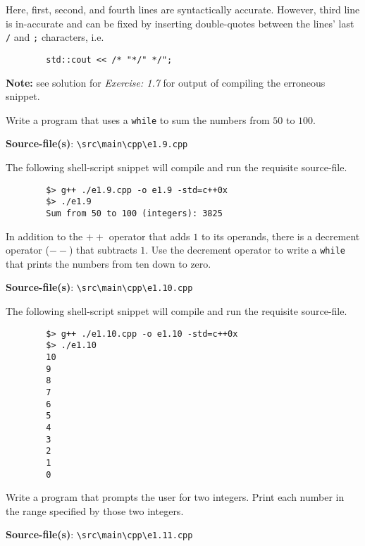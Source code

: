 \documentclass[12pt, a4paper]{article}
\begin{document}
    \noindent Here, first, second, and fourth lines are syntactically accurate.
    However, third line is in-accurate and can be fixed by inserting double-quotes between the lines' last \texttt{/} and \texttt{;} characters, i.e.
    \begin{verbatim}
        std::cout << /* "*/" */";
    \end{verbatim}

    \noindent\textbf{Note:} see solution for \textit{Exercise: 1.7} for output of compiling the erroneous snippet.

    \bigskip
    \begin{tcolorbox}[title={Exercise: 1.9}]
        Write a program that uses a \texttt{while} to sum the numbers from $50$ to $100$.
    \end{tcolorbox}
    \noindent\textbf{Source-file(s)}: \texttt{\textbackslash src\textbackslash main\textbackslash cpp\textbackslash e1.9.cpp}

    \noindent The following shell-script snippet will compile and run the requisite source-file.
    \begin{verbatim}
        $> g++ ./e1.9.cpp -o e1.9 -std=c++0x
        $> ./e1.9
        Sum from 50 to 100 (integers): 3825
    \end{verbatim}

    \bigskip
    \begin{tcolorbox}[title={Exercise: 1.10}]
        In addition to the $++$ operator that adds $1$ to its operands, there is a decrement operator ($--$) that subtracts $1$.
        Use the decrement operator to write a \texttt{while} that prints the numbers from ten down to zero.
    \end{tcolorbox}
    \noindent\textbf{Source-file(s)}: \texttt{\textbackslash src\textbackslash main\textbackslash cpp\textbackslash e1.10.cpp}

    \noindent The following shell-script snippet will compile and run the requisite source-file.
    \begin{verbatim}
        $> g++ ./e1.10.cpp -o e1.10 -std=c++0x
        $> ./e1.10
        10
        9
        8
        7
        6
        5
        4
        3
        2
        1
        0
    \end{verbatim}

    \bigskip
    \begin{tcolorbox}[title={Exercise: 1.11}]
        Write a program that prompts the user for two integers.
        Print each number in the range specified by those two integers.
    \end{tcolorbox}
    \noindent\textbf{Source-file(s)}: \texttt{\textbackslash src\textbackslash main\textbackslash cpp\textbackslash e1.11.cpp}
\end{document}
